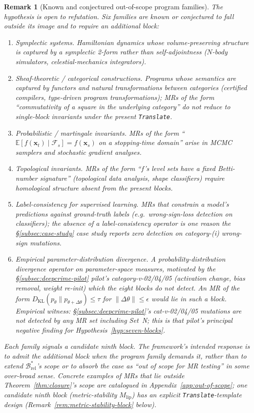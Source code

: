 \documentclass[manuscript]{acmart}
\newtheorem{remark}{Remark}
\begin{document}
\begin{remark}[Known and conjectured out-of-scope program families]
\label{rem:counterex}
The hypothesis is open to refutation. Six families are known or conjectured to fall outside its image and to require an additional block:
\begin{enumerate}
\item \emph{Symplectic systems.} Hamiltonian dynamics whose volume-preserving structure is captured by a symplectic 2-form rather than self-adjointness ($N$-body simulators, celestial-mechanics integrators).
\item \emph{Sheaf-theoretic / categorical constructions.} Programs whose semantics are captured by functors and natural transformations between categories (certified compilers, type-driven program transformations); MRs of the form ``commutativity of a square in the underlying category'' do not reduce to single-block invariants under the present \texttt{Translate}.
\item \emph{Probabilistic / martingale invariants.} MRs of the form ``$\mathbb{E}[f(\mathbf{x}_t) \mid \mathcal{F}_s] = f(\mathbf{x}_s)$ on a stopping-time domain'' arise in MCMC samplers and stochastic gradient analyses.
\item \emph{Topological invariants.} MRs of the form ``$f$'s level sets have a fixed Betti-number signature'' (topological data analysis, shape classifiers) require homological structure absent from the present blocks.
\item \emph{Label-consistency for supervised learning.} MRs that constrain a model's predictions against ground-truth labels (e.g.\ wrong-sign-loss detection on classifiers); the absence of a label-consistency operator is one reason the §\ref{subsec:case-study} case study reports zero detection on category-(i) wrong-sign mutations.
\item \emph{Empirical parameter-distribution divergence.} A probability-distribution divergence operator on parameter-space measures, motivated by the §\ref{subsec:deepcrime-pilot} pilot's category-v-02/04/05 (activation change, bias removal, weight re-init) which the eight blocks do not detect. An MR of the form $D_{\mathrm{KL}}(p_\theta \| p_{\theta+\Delta\theta}) \le \tau$ for $\|\Delta\theta\| \le \epsilon$ would lie in such a block. \emph{Empirical witness}: \S\ref{subsec:deepcrime-pilot}'s cat-v-02/04/05 mutations are not detected by any MR set including Set~N; this is that pilot's principal negative finding for Hypothesis~\ref{hyp:seven-blocks}.
\end{enumerate}
Each family signals a candidate ninth block. The framework's intended response is to admit the additional block when the program family demands it, rather than to extend $\mathcal{B}^{*}_{\mathrm{rel}}$'s scope or to absorb the case as ``out of scope for MR testing'' in some over-broad sense. Concrete examples of MRs that lie outside Theorem~\ref{thm:closure}'s scope are catalogued in Appendix~\ref{app:out-of-scope}; one candidate ninth block (metric-stability $M_{\mathrm{lip}}$) has an explicit \texttt{Translate}-template design (Remark~\ref{rem:metric-stability-block} below).
\end{remark}
\end{document}
